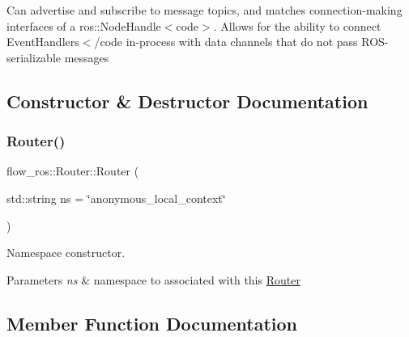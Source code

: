 Can advertise and subscribe to message topics, and matches connection-\/making interfaces of a {\ttfamily ros\+::\+Node\+Handle$<$code$>$. Allows for the ability to connect {\ttfamily Event\+Handlers$<$/code in-\/process with data channels that do not pass R\+O\+S-\/serializable messages }}

\subsection{Constructor \& Destructor Documentation}
\mbox{\label{classflow__ros_1_1_router_a90b7c5099932b00dee22ed58c99644a0}} 
\subsubsection{\texorpdfstring{Router()}{Router()}}
{\footnotesize\ttfamily flow\+\_\+ros\+::\+Router\+::\+Router (\begin{DoxyParamCaption}\item[{std\+::string}]{ns = {\ttfamily \char`\"{}anonymous\+\_\+local\+\_\+context\char`\"{}} }\end{DoxyParamCaption})\hspace{0.3cm}{\ttfamily [explicit]}}



Namespace constructor. 


\begin{DoxyParams}{Parameters}
{\em ns} & namespace to associated with this \hyperlink{classflow__ros_1_1_router}{Router} \\
\hline
\end{DoxyParams}


\subsection{Member Function Documentation}
\mbox{\label{classflow__ros_1_1_router_a9063ea60d71047f372d7321f36629ca4}} 
